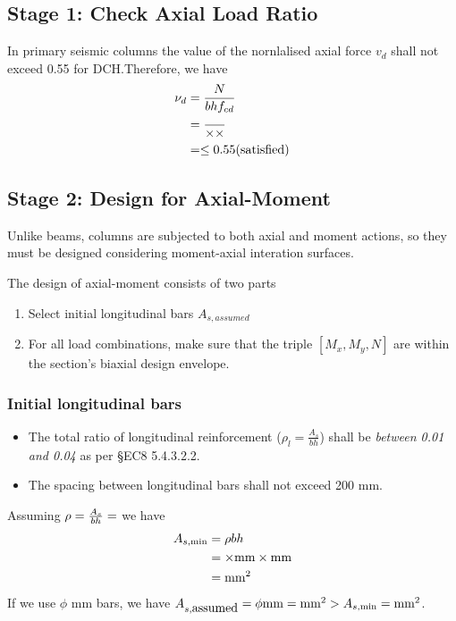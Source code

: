 \subsection{Stage 1: Check Axial Load Ratio}\label{sec:col-axi}
In primary seismic columns the value of the nornlalised axial force $v_{d}$
shall not exceed 0.55 for DCH.Therefore, we have
\begin{align*}
  \nu_{d} &= \frac{N}{bhf_{cd}} \\
          &= \frac{\MyGet{cl.N}}{\MyGet{cl.b}
            \times \MyGet{cl.h}
            \times \MyGet{fcd}} \\
  &= \MyGet{cl.vd} \le 0.55 \mbox{(satisfied)}
\end{align*}

\subsection{Stage 2: Design for Axial-Moment}\label{sec:col-am}
Unlike beams, columns are subjected to both axial and moment actions, so they
must be designed considering moment-axial interation surfaces.

The design of  axial-moment consists of two parts
\begin{enumerate}
\item Select initial longitudinal bars $A_{s,assumed}$
\item For all load combinations, make sure that the triple $[M_{x}, M_{y},N]$
  are within the section's biaxial design envelope.
\end{enumerate}

\renewcommand{\g}[1]{\MyGet{cl.#1}}

\subsubsection{Initial longitudinal bars}
\begin{itemize}
\item The total ratio of longitudinal reinforcement ($\rho_l = \frac{A_s}{bh}$)
  shall be \emph{between 0.01 and 0.04} as per \S EC8 5.4.3.2.2.
\item The spacing between longitudinal bars shall not exceed 200 mm.
\end{itemize}

Assuming $\rho = \frac{A_s}{bh} = \g{rho}$ we have
\begin{align*}
  A_{s,\min} &= \rho b h\\
             &= \g{rho} \times \g{b} \mbox{mm}
               \times \g{h} \mbox{mm} \\
             &= \g{Asmin} \mbox{mm}^2 
\end{align*}
If we use $\phi$ \g{bard} mm bars, we have $A_{s,\mbox{assumed}} = \g{barn} \phi \g{bard}
\mbox{mm} = \g{Asa} \mbox{mm}^2 > A_{s,\min} = \g{Asmin} \mbox{mm}^2$.

